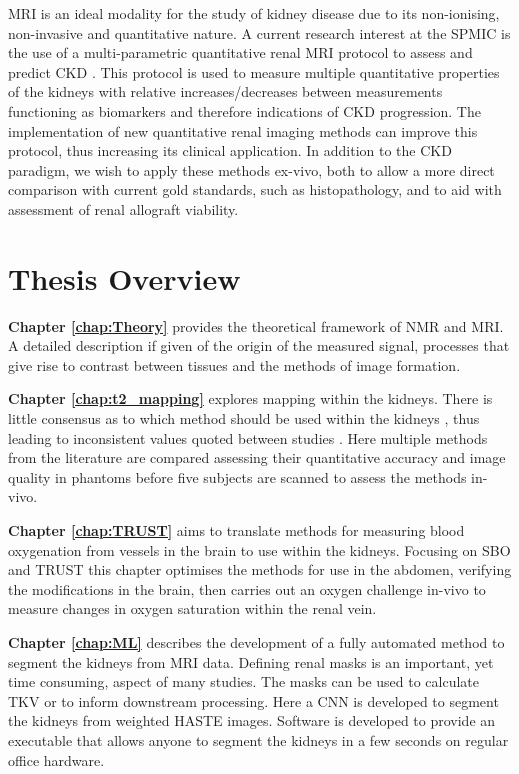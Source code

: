 \ac{MRI} is an ideal modality for the study of kidney disease due to its non-ionising, non-invasive and quantitative nature. A current research interest at the \ac{SPMIC} is the use of a multi-parametric quantitative renal \ac{MRI} protocol to assess and predict \ac{CKD} \cite{cox_multiparametric_2017, buchanan_quantitative_2019}. This protocol is used to measure multiple quantitative properties of the kidneys with relative increases/decreases between measurements functioning as biomarkers and therefore indications of \ac{CKD} progression. The implementation of new quantitative renal imaging methods can improve this protocol, thus increasing its clinical application. In addition to the \ac{CKD} paradigm, we wish to apply these methods ex-vivo, both to allow a more direct comparison with current gold standards, such as histopathology, and to aid with assessment of renal allograft viability.

\section{Thesis Overview}
\label{sec:intro_overview}

\textbf{Chapter \ref{chap:Theory}} provides the theoretical framework of \ac{NMR} and \ac{MRI}. A detailed description if given of the origin of the measured signal, processes that give rise to contrast between tissues and the methods of image formation.

\textbf{Chapter \ref{chap:t2_mapping}} explores \ttwo mapping within the kidneys. There is little consensus as to which method should be used within the kidneys \cite{dekkers_consensus-based_2019}, thus leading to inconsistent values quoted between studies \cite{wolf_magnetic_2018}. Here multiple methods from the literature are compared assessing their quantitative accuracy and image quality in phantoms before five subjects are scanned to assess the methods in-vivo.

\textbf{Chapter \ref{chap:TRUST}} aims to translate methods for measuring blood oxygenation from vessels in the brain to use within the kidneys. Focusing on \ac{SBO} \cite{jain_mri_2010} and \ac{TRUST} \cite{lu_quantitative_2008} this chapter optimises the methods for use in the abdomen, verifying the modifications in the brain, then carries out an oxygen challenge in-vivo to measure changes in oxygen saturation within the renal vein.

\textbf{Chapter \ref{chap:ML}} describes the development of a fully automated method to segment the kidneys from \ac{MRI} data. Defining renal masks is an important, yet time consuming, aspect of many studies. The masks can be used to calculate \ac{TKV} or to inform downstream processing. Here a \ac{CNN} is developed to segment the kidneys from \ttwo weighted \ac{HASTE} images. Software is developed to provide an executable that allows anyone to segment the kidneys in a few seconds on regular office hardware.

